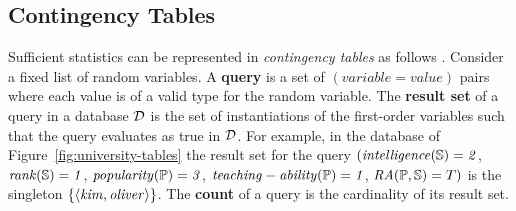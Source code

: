 \documentclass{acm_proc_article-sp}
\newcommand{\ct}{\mathit{ct}}
\begin{document}
\subsection{Contingency Tables}
Sufficient statistics can be represented in {\em contingency tables} as follows \cite{Moore1998}. 
%
%
%
Consider a fixed list of  random variables.
A \textbf{query} is a set of $(variable = value)$ pairs where each value is of a valid type for the random variable. 
The \textbf{result set} of a query in a database $\D$ is the set of instantiations of the first-order variables such that the query evaluates as true in $\D$.
For example, in the database of Figure~\ref{fig:university-tables} the result set for the query 
$(\it{intelligence}(\S) = 2$, $\it{rank}(\S) = 1$, $\it{popularity}(\P) = 3$, $\it{teaching-ability}(\P) = 1$, $\ra(\P,\S) = T)$ is the singleton $\{\langle \it{kim}, \it{oliver}\rangle\}$. 
The \textbf{count} of a query is the cardinality of its result set. 
\end{document}
